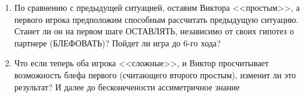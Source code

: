 \begin{problem}
\begin{enumerate}
\item По сравнению с предыдущей ситуацией, оставим Виктора
<<простым>>, а первого игрока предположим способным
рассчитать предыдущую ситуацию. Станет ли он на первом шаге
ОСТАВЛЯТЬ, независимо от своих гипотез о партнере
(БЛЕФОВАТЬ)? Пойдет ли игра до 6-го хода?

\item Что если теперь оба игрока <<сложные>>, и Виктор просчитывает
возможность блефа первого (считающего второго простым),
изменит ли это результат? {\red И далее до бесконечености ассиметричное знание}
\end{enumerate}





\begin{sol}

\end{sol}
\end{problem}




